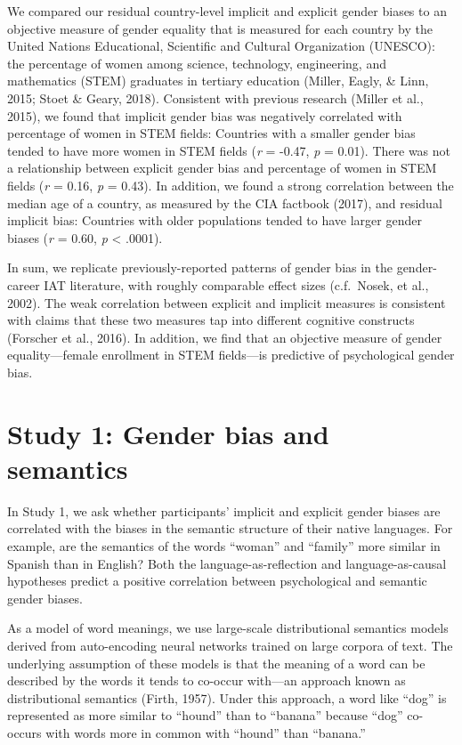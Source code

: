 \documentclass[man,floatsintext]{apa6}
\theoremstyle{definition}
\theoremstyle{definition}
\theoremstyle{definition}
\theoremstyle{remark}
\begin{document}
We compared our residual country-level implicit and explicit gender
biases to an objective measure of gender equality that is measured for
each country by the United Nations Educational, Scientific and Cultural
Organization (UNESCO): the percentage of women among science,
technology, engineering, and mathematics (STEM) graduates in tertiary
education (Miller, Eagly, \& Linn, 2015; Stoet \& Geary, 2018).
Consistent with previous research (Miller et al., 2015), we found that
implicit gender bias was negatively correlated with percentage of women
in STEM fields: Countries with a smaller gender bias tended to have more
women in STEM fields (\emph{r} = -0.47, \emph{p} = 0.01). There was not
a relationship between explicit gender bias and percentage of women in
STEM fields (\emph{r} = 0.16, \emph{p} = 0.43). In addition, we found a
strong correlation between the median age of a country, as measured by
the CIA factbook (2017), and residual implicit bias: Countries with
older populations tended to have larger gender biases (\emph{r} = 0.60,
\emph{p} \textless{} .0001).

In sum, we replicate previously-reported patterns of gender bias in the
gender-career IAT literature, with roughly comparable effect sizes
(c.f.~Nosek, et al., 2002). The weak correlation between explicit and
implicit measures is consistent with claims that these two measures tap
into different cognitive constructs (Forscher et al., 2016). In
addition, we find that an objective measure of gender equality---female
enrollment in STEM fields---is predictive of psychological gender bias.

\section{Study 1: Gender bias and
semantics}\label{study-1-gender-bias-and-semantics}

In Study 1, we ask whether participants' implicit and explicit gender
biases are correlated with the biases in the semantic structure of their
native languages. For example, are the semantics of the words
\enquote{woman} and \enquote{family} more similar in Spanish than in
English? Both the language-as-reflection and language-as-causal
hypotheses predict a positive correlation between psychological and
semantic gender biases.

As a model of word meanings, we use large-scale distributional semantics
models derived from auto-encoding neural networks trained on large
corpora of text. The underlying assumption of these models is that the
meaning of a word can be described by the words it tends to co-occur
with---an approach known as distributional semantics (Firth, 1957).
Under this approach, a word like \enquote{dog} is represented as more
similar to \enquote{hound} than to \enquote{banana} because
\enquote{dog} co-occurs with words more in common with \enquote{hound}
than \enquote{banana.}
\end{document}
